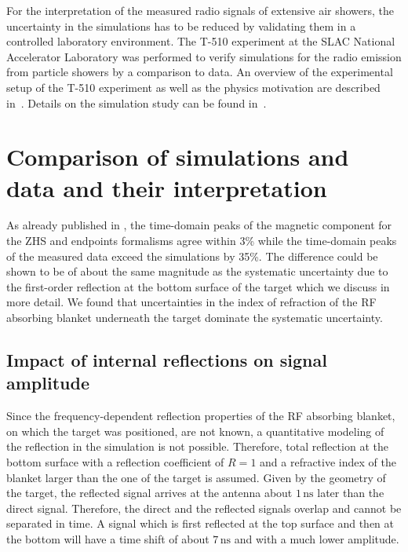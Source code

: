 \documentclass[epj]{webofc}
\begin{document}
For the interpretation of the measured radio signals of extensive air showers, 
the uncertainty in the simulations has to be reduced by validating them in a controlled laboratory environment.  The T-510 experiment at the SLAC National Accelerator Laboratory was performed to verify simulations for the radio emission from particle showers by a comparison to data. 
An overview of the experimental setup of the T-510 experiment as well as the physics motivation are described in~\cite{Katie}. Details on the simulation study can be found in~\cite{AnneICRC}.



\section{Comparison of simulations and data and their interpretation}
\vspace{-0.15cm}
As already published in \cite{PRL}, the time-domain peaks of the magnetic component for the ZHS and endpoints formalisms agree within 3\% while the time-domain peaks of the measured data exceed the simulations by 35\%. The difference could be shown to be of about the same magnitude as the systematic uncertainty due to the first-order reflection at the bottom surface of the target which we discuss in more detail. We found that uncertainties in the index of refraction of the RF absorbing blanket underneath the target dominate the systematic uncertainty.

\subsection{Impact of internal reflections on signal amplitude}
\vspace{-0.15cm}
Since the frequency-dependent reflection properties of the RF absorbing blanket, on which the target was positioned, are not known, a quantitative modeling of the reflection in the simulation is not possible. 
Therefore, total reflection at the bottom surface with a reflection coefficient of $R=1$  and a refractive index of the blanket larger than the one of the target is assumed. 
Given by the geometry of the target, the reflected signal arrives at the antenna about $1\,\mbox{ns}$ later than the direct signal. Therefore, the direct and the reflected signals overlap and cannot be separated in time. 
A signal which is first reflected at the top surface and then at the bottom will have a time shift of about $7\,\mbox{ns}$ and with a much lower amplitude.
\end{document}
